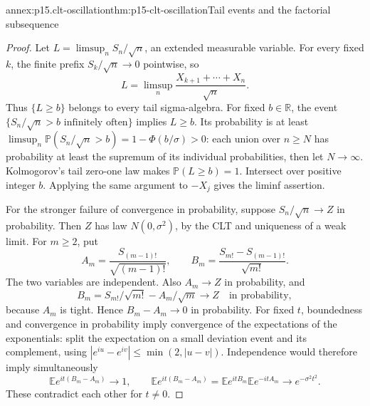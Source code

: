 \begin{annexitem}{annex:p15.clt-oscillation}{thm:p15-clt-oscillation}{Tail events and the factorial subsequence}
\begin{proof}
Let \(L=\limsup_n S_n/\sqrt n\), an extended measurable variable.
For every fixed \(k\), the finite prefix \(S_k/\sqrt n\to0\)
pointwise, so
\[
 L=\limsup_n\frac{X_{k+1}+\cdots+X_n}{\sqrt n}.
 \]
Thus \(\{L\geq b\}\) belongs to every tail sigma-algebra.
For fixed \(b\in\mathbb R\), the event
\(\{S_n/\sqrt n>b\text{ infinitely often}\}\) implies \(L\geq b\).
Its probability is at least
\(\limsup_n\mathbb P(S_n/\sqrt n>b)=1-\Phi(b/\sigma)>0\):
each union over \(n\geq N\) has probability at least the supremum
of its individual probabilities, then let \(N\to\infty\).
Kolmogorov's tail zero-one law makes
\(\mathbb P(L\geq b)=1\). Intersect over positive integer \(b\).
Applying the same argument to \(-X_j\) gives the liminf assertion.

For the stronger failure of convergence in probability, suppose
\(S_n/\sqrt n\to Z\) in probability. Then \(Z\) has law
\(N(0,\sigma^2)\), by the CLT and uniqueness of a weak limit.
For \(m\geq2\), put
\[
 A_m=\frac{S_{(m-1)!}}{\sqrt{(m-1)!}},\qquad
 B_m=\frac{S_{m!}-S_{(m-1)!}}{\sqrt{m!}}.
 \]
The two variables are independent. Also \(A_m\to Z\) in
probability, and
\[
 B_m=S_{m!}/\sqrt{m!}-A_m/\sqrt m\longrightarrow Z
                                               \quad\text{in probability},
 \]
because \(A_m\) is tight. Hence \(B_m-A_m\to0\) in probability.
For fixed \(t\), boundedness and convergence in probability imply
convergence of the expectations of the exponentials: split the
expectation on a small deviation event and its complement, using
\(|e^{iu}-e^{iv}|\leq\min(2,|u-v|)\).
Independence would therefore imply simultaneously
\[
 \mathbb Ee^{it(B_m-A_m)}\to1,\qquad
 \mathbb Ee^{it(B_m-A_m)}
 =\mathbb Ee^{itB_m}\mathbb Ee^{-itA_m}
 \longrightarrow e^{-\sigma^2t^2}.
 \]
These contradict each other for \(t\ne0\).
\end{proof}
\end{annexitem}


